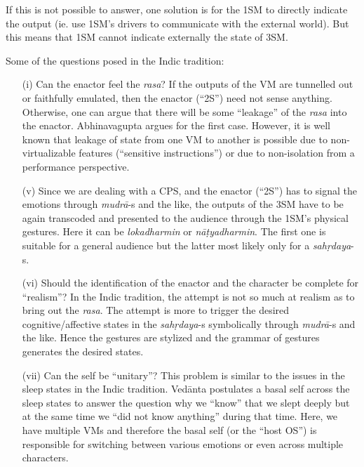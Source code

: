 If this is not possible to answer, one solution is for the 1SM to directly indicate the output (ie. use 1SM’s drivers to communicate with the external world). But this means that 1SM cannot indicate externally the state of 3SM. 

Some of the questions posed in the Indic tradition:
\begin{itemize}
\itemsep=0pt
\item[(i)] Can the enactor feel the \textsl{rasa}? If the outputs of the VM are tunnelled out or faithfully emulated, then the enactor (“2S”) need not sense anything. Otherwise, one can argue that there will be some “leakage” of the \textsl{rasa} into the enactor. Abhinavagupta argues for the first case. However, it is well known that leakage of state from one VM to another is possible due to non-virtualizable features (“sensitive instructions”) or due to non-isolation from a performance perspective. 

\item[(v)] Since we are dealing with a CPS, and the enactor (“2S”) has to signal the emotions through \textsl{mudrā}-s and the like, the outputs of the 3SM have to be again transcoded and presented to the audience through the 1SM’s physical gestures. Here it can be \textsl{lokadharmin} or \textsl{nāṭyadharmin}. The first one is suitable for a general audience but the latter most likely only for a \textsl{sahṛdaya}-s.

\item[(vi)] Should the identification of the enactor and the character be complete for “realism”? In the Indic tradition, the attempt is not so much at realism as to bring out the \textsl{rasa}. The attempt is more to trigger the desired cognitive/affective states in the \textsl{sahṛdaya}-s symbolically through \textsl{mudrā}-s and the like. Hence the gestures are stylized and the grammar of gestures generates the desired states.

\item[(vii)] Can the self be “unitary”? This problem is similar to the issues in the sleep states in the Indic tradition. Vedānta postulates a basal self across the sleep states to answer the question why we “know” that we slept deeply but at the same time we “did not know anything” during that time. Here, we have multiple VMs and therefore the basal self (or the “host OS”) is responsible for switching between various emotions or even across multiple characters.
\end{itemize}

